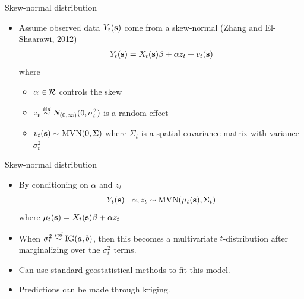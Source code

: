 \documentclass{beamer}
\begin{document}
\begin{frame}{Skew-normal distribution}
  \begin{itemize} \setlength{\itemsep}{0.5em}
    \item Assume observed data $Y_t(\mbox{\bf s})$ come from a skew-normal (Zhang and El-Shaarawi, 2012)
    \begin{align*}
      Y_t(\mbox{\bf s}) = X_t(\mbox{\bf s})\beta + \alpha z_t + v_t(\mbox{\bf s})
    \end{align*}
    where
    \begin{itemize} \setlength{\itemsep}{0.25em}
      \item $\alpha \in {\cal R}$ controls the skew
      \item $z_t \stackrel{iid}{\sim} N_{(0, \infty)}(0, \sigma^2_t)$ is a random effect
      \item $v_t(\mbox{\bf s}) \sim \text{MVN}(0, \Sigma)$ where $\Sigma_t$ is a spatial covariance matrix with variance $\sigma^2_t$
    \end{itemize}
  \end{itemize}
\end{frame}

\begin{frame}{Skew-normal distribution}
  \begin{itemize} \setlength{\itemsep}{0.5em}
    \item By conditioning on $\alpha$ and $z_t$
    \begin{align*}
      Y_t(\mbox{\bf s}) \mid \alpha, z_t \sim \text{MVN}(\mu_t(\mbox{\bf s}), \Sigma_t)
    \end{align*}
    where $\mu_t(\mbox{\bf s}) = X_t(\mbox{\bf s}) \beta + \alpha z_t$
    \item When $\sigma_t^2 \stackrel{iid}{\sim} \text{IG}(a, b)$, then this becomes a multivariate $t$-distribution
    after marginalizing over the $\sigma_t^2$ terms.
    \item Can use standard geostatistical methods to fit this model.
    \item Predictions can be made through kriging.
  \end{itemize}
\end{frame}
\end{document}
